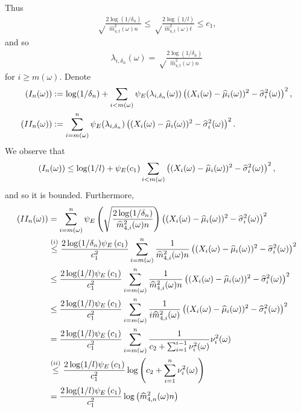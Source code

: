     Thus
    \begin{align*}
        \sqrt\frac{2\log(1/\delta_n)}{\widehat m_{4, t}^2(\omega) n} \leq \sqrt\frac{2\log(1/l)}{\widehat m_{4, t}^2(\omega) t} \leq  c_1,
    \end{align*}
    and so
    \begin{align*}
        \lambda_{i,\delta_n}(\omega) =  \sqrt\frac{2\log(1/\delta_n)}{\widehat m_{4, t}^2(\omega) n}
    \end{align*}
    for $i \geq m(\omega)$. Denote
    \begin{align*}
    (I_n(\omega)) &:= \log(1/\delta_n) + \sum_{i < m(\omega)}\psi_E(\lambda_{i, \delta_n}(\omega)) \left( (X_i(\omega) - \widehat\mu_i(\omega))^2 - \widehat \sigma_i^2 (\omega) \right)^2,
    \\ (II_n(\omega)) &:= \sum_{i=m(\omega)}^n\psi_E(\lambda_{i, \delta_n}) \left( (X_i(\omega) - \widehat\mu_i(\omega))^2 - \widehat \sigma_i^2(\omega) \right)^2.
    \end{align*}
    We observe that
    \begin{align*}
        (I_n(\omega)) \leq \log(1/l) + \psi_E(c_1)\sum_{i < m(\omega)} \left( (X_i(\omega) - \widehat\mu_i(\omega))^2 - \widehat \sigma_i^2(\omega) \right)^2,
    \end{align*}
    and so it is bounded. Furthermore,
    \begin{align*}
        (II_n(\omega)) &= \sum_{i=m(\omega)}^n\psi_E \left( \sqrt\frac{2\log(1/\delta_n)}{\widehat m_{4, i}^2(\omega) n} \right) \left( (X_i(\omega) - \widehat\mu_i(\omega))^2 - \widehat \sigma_i^2(\omega) \right)^2
        \\&\stackrel{(i)}{\leq} \frac{2\log(1/\delta_n)\psi_E \left(  c_1 \right)}{c_1^2}  \sum_{i=m(\omega)}^n \frac{1}{\widehat m_{4, i}^2(\omega) n} \left( (X_i(\omega) - \widehat\mu_i(\omega))^2 - \widehat \sigma_i^2(\omega) \right)^2
        \\&\stackrel{}{\leq} \frac{2\log(1/l)\psi_E \left(  c_1 \right)}{c_1^2}  \sum_{i=m(\omega)}^n \frac{1}{\widehat m_{4, i}^2(\omega) n} \left( (X_i(\omega) - \widehat\mu_i(\omega))^2 - \widehat \sigma_i^2(\omega) \right)^2
        \\&\stackrel{}{\leq} \frac{2\log(1/l)\psi_E \left(  c_1 \right)}{c_1^2 }  \sum_{i=m(\omega)}^n \frac{1}{i\widehat m_{4, i}^2(\omega) } \left( (X_i(\omega) - \widehat\mu_i(\omega))^2 - \widehat \sigma_i^2(\omega) \right)^2
        \\&\stackrel{}{=} \frac{2\log(1/l)\psi_E \left(  c_1 \right)}{c_1^2 }  \sum_{i=m(\omega)}^n \frac{1}{c_2 + \sum_{i = 1}^{i-1} \nu_i^2 (\omega)} \nu_i^2(\omega)
        \\&\stackrel{(ii)}{\leq} \frac{2\log(1/l)\psi_E \left(  c_1 \right)}{c_1^2 }  \log \left( c_2 + \sum_{i = 1}^{n} \nu_i^2 (\omega) \right)
        \\&\stackrel{}{=} \frac{2\log(1/l)\psi_E \left(  c_1 \right)}{c_1^2 }  \log \left( \widehat m_{4, n}^2(\omega) n \right)
    \end{align*}
